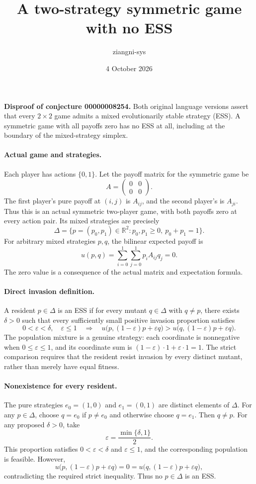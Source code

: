 \documentclass[11pt]{article}
\title{A two-strategy symmetric game with no ESS}
\author{ziangni-sys}
\date{4 October 2026}
\begin{document}
\raggedright
\maketitle
\noindent\textbf{Disproof of conjecture 00000008254.}
Both original language versions assert that every $2\times2$ game admits a mixed evolutionarily stable strategy (ESS). A symmetric game with all payoffs zero has no ESS at all, including at the boundary of the mixed-strategy simplex.

\paragraph{Actual game and strategies.}
Each player has actions $\{0,1\}$. Let the payoff matrix for the symmetric game be
\[
 A=\begin{pmatrix}0&0\\0&0\end{pmatrix}.
\]
The first player's pure payoff at $(i,j)$ is $A_{ij}$, and the second player's is $A_{ji}$. Thus this is an actual symmetric two-player game, with both payoffs zero at every action pair. Its mixed strategies are precisely
\[
 \Delta=\{p=(p_0,p_1)\in\mathbb R^2:p_0,p_1\geq0,\ p_0+p_1=1\}.
\]
For arbitrary mixed strategies $p,q$, the bilinear expected payoff is
\[
 u(p,q)=\sum_{i=0}^1\sum_{j=0}^1p_i A_{ij}q_j=0.
\]
The zero value is a consequence of the actual matrix and expectation formula.

\paragraph{Direct invasion definition.}
A resident $p\in\Delta$ is an ESS if for every mutant $q\in\Delta$ with $q\ne p$, there exists $\delta>0$ such that every sufficiently small positive invasion proportion satisfies
\[
 0<\varepsilon<\delta,\quad\varepsilon\leq1
 \quad\Longrightarrow\quad
 u\bigl(p,(1-\varepsilon)p+\varepsilon q\bigr)
 >u\bigl(q,(1-\varepsilon)p+\varepsilon q\bigr).
\]
The population mixture is a genuine strategy: each coordinate is nonnegative when $0\leq\varepsilon\leq1$, and its coordinate sum is
$(1-\varepsilon)\cdot1+\varepsilon\cdot1=1$.
The strict comparison requires that the resident resist invasion by every distinct mutant, rather than merely have equal fitness.

\paragraph{Nonexistence for every resident.}
The pure strategies $e_0=(1,0)$ and $e_1=(0,1)$ are distinct elements of $\Delta$. For any $p\in\Delta$, choose $q=e_0$ if $p\ne e_0$ and otherwise choose $q=e_1$. Then $q\ne p$.
For any proposed $\delta>0$, take
\[
 \varepsilon=\frac{\min\{\delta,1\}}{2}.
\]
This proportion satisfies $0<\varepsilon<\delta$ and $\varepsilon\leq1$, and the corresponding population is feasible. However,
\[
 u\bigl(p,(1-\varepsilon)p+\varepsilon q\bigr)
 =0=
 u\bigl(q,(1-\varepsilon)p+\varepsilon q\bigr),
\]
contradicting the required strict inequality. Thus no $p\in\Delta$ is an ESS.
\newpage
\end{document}
